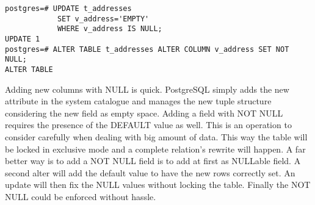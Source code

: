 \begin{lstlisting}[style=pgsql]
postgres=# UPDATE t_addresses
            SET v_address='EMPTY'
            WHERE v_address IS NULL;
UPDATE 1
postgres=# ALTER TABLE t_addresses ALTER COLUMN v_address SET NOT NULL;
ALTER TABLE

\end{lstlisting}

Adding new columns with NULL is quick. PostgreSQL simply adds the new attribute in the system 
catalogue and manages the new tuple structure considering the new field as empty space. Adding 
a field with NOT NULL requires the presence of the DEFAULT value as well. This is an operation to 
consider carefully when dealing with big amount of data. This way the table will be locked in 
exclusive mode and a complete relation's rewrite will happen. A far better way is to add a NOT NULL 
field is to add at first as NULLable field. A second alter will add the default value to have the 
new rows correctly set. An update will then fix the NULL values without locking the 
table. Finally the NOT NULL could be enforced without hassle.